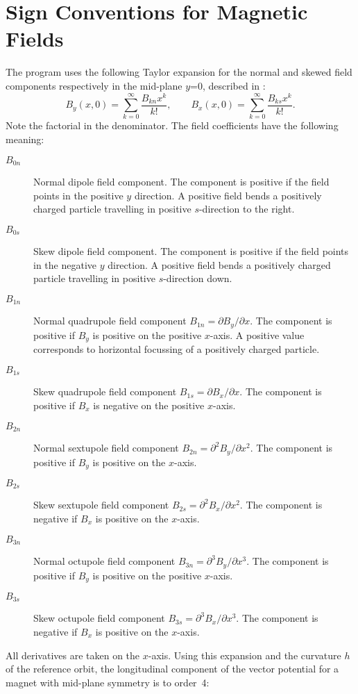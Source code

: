 \section{Sign Conventions for Magnetic Fields}
\label{sec:sign}
The \opalmap program uses the following Taylor expansion for the normal and
skewed field components respectively in the mid-plane $y$=0, 
described in :
\[
B_y(x,0)=\sum_{k=0}^{\infty}\frac{B_{kn}x^k}{k!}, \qquad
B_x(x,0)=\sum_{k=0}^{\infty}\frac{B_{ks}x^k}{k!}.
\]
Note the factorial in the denominator.
The field coefficients have the following meaning:
\begin{description}
\item[$B_{0n}$] Normal dipole field component.
  The component is positive if the field points in the positive $y$
  direction. 
  A positive field bends a positively charged particle travelling in
  positive $s$-direction to the right.
\item[$B_{0s}$] Skew dipole field component.
  The component is positive if the field points in the negative $y$
  direction. 
  A positive field bends a positively charged particle travelling in
  positive $s$-direction down.
\item[$B_{1n}$] Normal quadrupole field component
  $B_{1n}=\partial B_y/\partial x$.
  The component is positive if $B_y$ is positive on the positive $x$-axis.
  A positive value corresponds to horizontal focussing of a positively
  charged particle.
\item[$B_{1s}$] Skew quadrupole field component
  $B_{1s}=\partial B_x/\partial x$.
  The component is positive if $B_x$ is negative on the positive $x$-axis.
\item[$B_{2n}$] Normal sextupole field component
  $B_{2n}=\partial^2 B_y/\partial x^2$.
  The component is positive if $B_y$ is positive on the $x$-axis.
\item[$B_{2s}$] Skew sextupole field component
  $B_{2s}=\partial^2 B_x/\partial x^2$.
  The component is negative if $B_x$ is positive on the $x$-axis.
\item[$B_{3n}$] Normal octupole field component
  $B_{3n}=\partial^3 B_y/\partial x^3$.
  The component is positive if $B_y$ is positive on the positive $x$-axis.
\item[$B_{3s}$] Skew octupole field component
  $B_{3s}=\partial^3 B_x/\partial x^3$.
  The component is negative if $B_x$ is positive on the $x$-axis.
\end{description}
All derivatives are taken on the $x$-axis.
Using this expansion and the curvature $h$ of the reference orbit,
the longitudinal component of the vector potential for a magnet with
mid-plane symmetry is to order~4:

